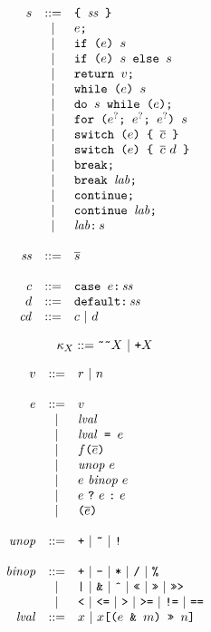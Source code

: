 \documentclass{article}
\newcommand{\ternary}[3]{{#1}\ \mathjs{?}\ {#2}\ \mathjs{:}\ {#3}}
\newcommand{\funcall}[2]{{#1}\mathjs{(}{#2}\mathjs{)}}
\newcommand{\paren}[1]{\mathjs{(}{#1}\mathjs{)}}
\newcommand{\seq}[1]{\overline{{#1}}}
\newcommand{\mathjs}[1]{\mbox{\texttt{{#1}}}}
\newcommand{\return}[1]{\mathjs{return }{#1}\mathjs{;}}
\newcommand{\while}[2]{\mathjs{while (}{#1}\mathjs{) }{#2}}
\newcommand{\dowhile}[2]{\mathjs{do }{#1}\mathjs{ while (}{#2}\mathjs{);}}
\newcommand{\for}[4]{\mathjs{for (}{#1}\mathjs{; }{#2}\mathjs{; }{#3}\mathjs{) }{#4}}
\newcommand{\switch}[2]{\mathjs{switch (}{#1}\mathjs{) \{ }{#2}\mathjs{ \}}}
\newcommand{\brk}{\mathjs{break;}}
\newcommand{\brkl}[1]{\mathjs{break }{#1}\mathjs{;}}
\newcommand{\cont}{\mathjs{continue;}}
\newcommand{\contl}[1]{\mathjs{continue }{#1}\mathjs{;}}
\newcommand{\lab}[2]{{#1}\mathjs{:}\,{#2}}
\newcommand{\ifthen}[2]{\mathjs{if (}{#1}\mathjs{) }{#2}}
\newcommand{\ifthenelse}[3]{\mathjs{if (}{#1}\mathjs{) }{#2}\mathjs{ else }{#3}}
\newcommand{\block}[1]{\mathjs{\{ }{#1}\mathjs{ \}}}
\newcommand{\getprop}[2]{{#1}\mathjs{[}{#2}\mathjs{]}}
\newcommand{\tobits}[1]{\mathjs{\~{}\~{}}{#1}}
\newcommand{\tofloat}[1]{\mathjs{+}{#1}}
\begin{document}
\[
\begin{array}{rcl}
s & ::= & \block{\mathit{ss}} \\
  &  |  & e\mathjs{;} \\
  &  |  & \ifthen{e}{s} \\
  &  |  & \ifthenelse{e}{s}{s} \\
  &  |  & \return{v} \\
  &  |  & \while{e}{s} \\
  &  |  & \dowhile{s}{e} \\
  &  |  & \for{e^?}{e^?}{e^?}{s} \\
  &  |  & \switch{e}{\seq{c}} \\
  &  |  & \switch{e}{\seq{c}\ d} \\
  &  |  & \brk \\
  &  |  & \brkl{\mathit{lab}} \\
  &  |  & \cont \\
  &  |  & \contl{\mathit{lab}} \\
  &  |  & \lab{\mathit{lab}}{s} \\
\\
\mathit{ss} & ::= & \seq{s} \\
\\
c & ::= & \mathjs{case }e\mathjs{:}\,\mathit{ss} \\
d & ::= & \mathjs{default:}\,\mathit{ss} \\
\mathit{cd} & ::= & c ~|~ d \\
\end{array}
\]

\[
\kappa_X ::= \tobits{X} ~|~ \tofloat{X}
\]

\[
\begin{array}{rcl}
v & ::= & r ~|~ n \\
\\
e & ::= & v \\
  &  |  & \mathit{lval} \\
  &  |  & \mathit{lval}\mathjs{ = }e \\
  &  |  & \funcall{f}{\seq{e}} \\
  &  |  & \mathit{unop}\ e \\
  &  |  & e\ \mathit{binop}\ e \\
  &  |  & \ternary{e}{e}{e} \\
  &  |  & \paren{\seq{e}} \\
\\
\mathit{unop} & ::= & \mathjs{+} ~|~ \mathjs{\~{}} ~|~ \mathjs{!} \\
\\
\mathit{binop} & ::= & \mathjs{+} ~|~ \mathjs{-} ~|~ \mathjs{*} ~|~ \mathjs{/} ~|~ \mathjs{\%} \\
               &  |  & \mathjs{|} ~|~ \mathjs{\&} ~|~ \mathjs{\^{}} ~|~ \mathjs{<<} ~|~ \mathjs{>>} ~|~ \mathjs{>>>} \\
               &  |  & \mathjs{<} ~|~ \mathjs{<=} ~|~ \mathjs{>} ~|~ \mathjs{>=} ~|~ \mathjs{!=} ~|~ \mathjs{==} \\
\mathit{lval} & ::= & x ~|~ \getprop{x}{\paren{e\mathjs{ \& }m}\mathjs{ >> }n} \\
\end{array}
\]
\end{document}
